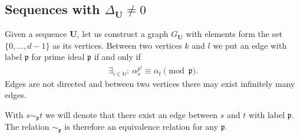\documentclass[preprint,12pt]{elsarticle}
\newcommand{\N}{\mathbb{N}}
\newcommand{\pp}{\mathfrak{p} }
\begin{document}
\subsection{Sequences with $\Delta_{\mathbf U}\not=0$}





Given a sequence $\mathbf{U}$, let us construct a graph $G_\mathbf{U}$ with elements form the set $\{0, \ldots, d-1\}$ as its vertices. Between two vertices $k$ and $l$ we put an edge with label $\pp$ for prime ideal $\pp$ if and only if 
\begin{align}
    \exists_{i\in\N}: \ \alpha_s^{p^i}  \equiv \alpha_t \pmod \pp.
\end{align} 
Edges are not directed and between two vertices there may exist infinitely many edges. %

With $s \sim_\pp t$ we will denote that there exist an edge between $s$ and $t$ with label $\pp$. The relation $\sim_\pp$ is therefore an equivalence relation for any $\pp$.
\end{document}
